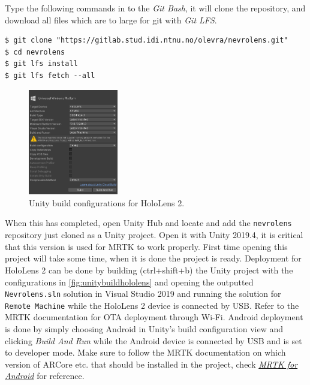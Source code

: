 Type the following commands in to the \textit{Git Bash}, it will clone the repository, and download all files which are to large for git with \textit{Git LFS}.
\begin{lstlisting}[numbers=none]
$ git clone "https://gitlab.stud.idi.ntnu.no/olevra/nevrolens.git"
$ cd nevrolens
$ git lfs install
$ git lfs fetch --all
\end{lstlisting}

\begin{figure} 
    \centering
    \includegraphics[width=0.35\textwidth]{fig/unitybuildhololens.png}
    \caption{Unity build configurations for HoloLens 2.}
    \label{fig:unitybuildhololens}
\end{figure}
When this has completed, open Unity Hub and locate and add the \texttt{nevrolens} repository just cloned as a Unity project. Open it with Unity 2019.4, it is critical that this version is used for MRTK to work properly. First time opening this project will take some time, when it is done the project is ready. Deployment for HoloLens 2 can be done by building (ctrl+shift+b) the Unity project with the configurations in \autoref{fig:unitybuildhololens} and opening the outputted \texttt{Nevrolens.sln} solution in Visual Studio 2019 and running the solution for \texttt{Remote Machine} while the HoloLens 2 device is connected by USB. Refer to the MRTK documentation for OTA deployment through Wi-Fi. Android deployment is done by simply choosing Android in Unity's build configuration view and clicking \textit{Build And Run} while the Android device is connected by USB and is set to developer mode. Make sure to follow the MRTK documentation on which version of ARCore etc. that should be installed in the project, check \href{https://microsoft.github.io/MixedRealityToolkit-Unity/version/releases/2.5.1/Documentation/CrossPlatform/UsingARFoundation.html}{\textit{MRTK for Android}} for reference.
